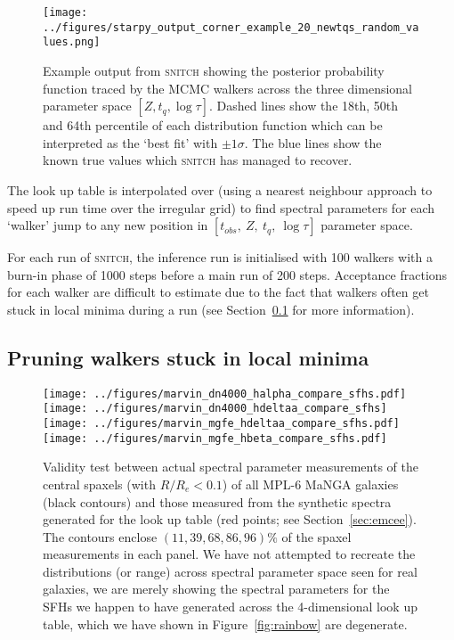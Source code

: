 \documentclass[useAMS,usenatbib]{mn2e}
\begin{document}
\begin{figure*}
\centering
\texttt{[image: ../figures/starpy\_output\_corner\_example\_20\_newtqs\_random\_values.png]}
\caption{Example output from \textsc{snitch} showing the posterior probability function traced by the MCMC walkers across the three dimensional parameter space $[Z, t_q, \log\tau]$. Dashed lines show the 18th, 50th and 64th percentile of each distribution function which can be interpreted as the `best fit' with $±1\sigma$. The blue lines show the known true values which \textsc{snitch} has managed to recover.}
\label{fig:output}
\end{figure*}
 
The look up table is interpolated over (using a nearest neighbour approach to speed up run time over the irregular grid) to find spectral parameters for each `walker' jump to any new position in $[t_{obs},~Z,~t_q,~\log\tau]$ parameter space. 

For each run of \textsc{snitch}, the inference run is initialised with 100 walkers with a burn-in phase of 1000 steps before a main run of 200 steps. Acceptance fractions for each walker are difficult to estimate due to the fact that walkers often get stuck in local minima during a run (see Section~\ref{sec:pruning} for more information). 



\subsection{Pruning walkers stuck in local minima}\label{sec:pruning}

\begin{figure*}
\centering
\texttt{[image: ../figures/marvin\_dn4000\_halpha\_compare\_sfhs.pdf]}
\texttt{[image: ../figures/marvin\_dn4000\_hdeltaa\_compare\_sfhs]}
\texttt{[image: ../figures/marvin\_mgfe\_hdeltaa\_compare\_sfhs.pdf]}
\texttt{[image: ../figures/marvin\_mgfe\_hbeta\_compare\_sfhs.pdf]}
\caption{Validity test between actual spectral parameter measurements of the central spaxels (with $R/R_e < 0.1$) of all MPL-6 MaNGA galaxies (black contours) and those measured from the synthetic spectra generated for the look up table (red points; see Section~\ref{sec:emcee}). The contours enclose $(11, 39, 68, 86, 96)\%$ of the spaxel measurements in each panel. We have not attempted to recreate the distributions (or range) across spectral parameter space seen for real galaxies, we are merely showing the spectral parameters for the SFHs we happen to have generated across the 4-dimensional look up table, which we have shown in Figure~\ref{fig:rainbow} are degenerate.}
\label{fig:compare_manga_specmeas}
\end{figure*}
\end{document}
